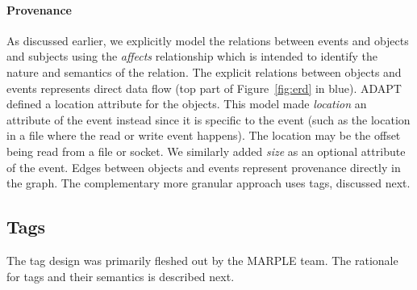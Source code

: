 \documentclass[10pt, conference, onecolumn]{IEEEtran}
\begin{document}
\paragraph{Provenance} 
As discussed earlier, we explicitly model the relations between events and objects and subjects using the \textit{affects} relationship which is intended to identify the nature and semantics of the relation. 
The explicit relations between objects and events represents direct data flow (top part of Figure~\ref{fig:erd} in blue). 
ADAPT defined a location attribute for the objects. This model made \textit{location} an attribute of the event instead since it is specific to the event (such as the location in a file where the read or write event happens).
The location may be the offset being read from a file or socket.
We similarly added \textit{size} as an optional attribute of the event. Edges between objects and events represent provenance directly in the graph. The complementary more granular approach uses tags, discussed next.

\subsection{Tags} \label{sec:tags}
The tag design was primarily fleshed out by the MARPLE team. The rationale for tags and their semantics is described next.
\end{document}
